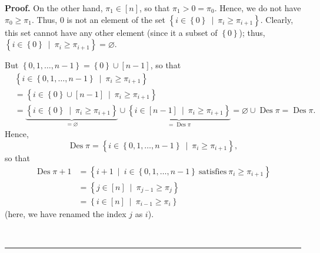 \documentclass[numbers=enddot,12pt,final,onecolumn,notitlepage]{scrartcl}%
\theoremstyle{definition}
\newenvironment{proof}[1][Proof]{\noindent\textbf{#1.} }{\ \rule{0.5em}{0.5em}}
\begin{document}
\begin{proof}
On the other hand, $\pi_{1}\in\left[  n\right]  $, so that $\pi_{1}>0=\pi_{0}%
$. Hence, we do not have $\pi_{0}\geq\pi_{1}$. Thus, $0$ is not an element of
the set $\left\{  i\in\left\{  0\right\}  \ \mid\ \pi_{i}\geq\pi
_{i+1}\right\}  $. Clearly, this set cannot have any other element (since it a
subset of $\left\{  0\right\}  $); thus, $\left\{  i\in\left\{  0\right\}
\ \mid\ \pi_{i}\geq\pi_{i+1}\right\}  =\varnothing$.

But $\left\{  0,1,\ldots,n-1\right\}  =\left\{  0\right\}  \cup\left[
n-1\right]  $, so that
\begin{align*}
&  \left\{  i\in\left\{  0,1,\ldots,n-1\right\}  \ \mid\ \pi_{i}\geq\pi
_{i+1}\right\} \\
&  =\left\{  i\in\left\{  0\right\}  \cup\left[  n-1\right]  \ \mid\ \pi
_{i}\geq\pi_{i+1}\right\} \\
&  =\underbrace{\left\{  i\in\left\{  0\right\}  \ \mid\ \pi_{i}\geq\pi
_{i+1}\right\}  }_{=\varnothing}\cup\underbrace{\left\{  i\in\left[
n-1\right]  \ \mid\ \pi_{i}\geq\pi_{i+1}\right\}  }_{=\operatorname*{Des}\pi
}=\varnothing\cup\operatorname*{Des}\pi=\operatorname*{Des}\pi.
\end{align*}
Hence,%
\[
\operatorname*{Des}\pi=\left\{  i\in\left\{  0,1,\ldots,n-1\right\}
\ \mid\ \pi_{i}\geq\pi_{i+1}\right\}  ,
\]
so that%
\begin{align}
\operatorname*{Des}\pi+1  &  =\left\{  i+1\ \mid\ i\in\left\{  0,1,\ldots
,n-1\right\}  \ \text{satisfies}\ \pi_{i}\geq\pi_{i+1}\right\} \nonumber\\
&  =\left\{  j\in\left[  n\right]  \ \mid\ \pi_{j-1}\geq\pi_{j}\right\}
\nonumber\\
&  =\left\{  i\in\left[  n\right]  \ \mid\ \pi_{i-1}\geq\pi_{i}\right\}
\label{pf.prop.Epk.through-Des.Des+1}%
\end{align}
(here, we have renamed the index $j$ as $i$).


\end{proof}
\end{document}

